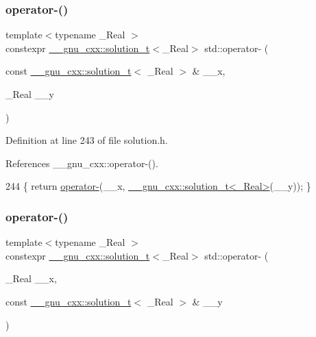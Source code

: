 \subsubsection{\texorpdfstring{operator-\/()}{operator-()}\hspace{0.1cm}{\footnotesize\ttfamily [3/6]}}
{\footnotesize\ttfamily template$<$typename \+\_\+\+Real $>$ \\
constexpr \hyperlink{namespace____gnu__cxx_ae20ea642de50eb361074c62676b0159c}{\+\_\+\+\_\+gnu\+\_\+cxx\+::solution\+\_\+t}$<$\+\_\+\+Real$>$ std\+::operator-\/ (\begin{DoxyParamCaption}\item[{const \hyperlink{namespace____gnu__cxx_ae20ea642de50eb361074c62676b0159c}{\+\_\+\+\_\+gnu\+\_\+cxx\+::solution\+\_\+t}$<$ \+\_\+\+Real $>$ \&}]{\+\_\+\+\_\+x,  }\item[{\+\_\+\+Real}]{\+\_\+\+\_\+y }\end{DoxyParamCaption})}



Definition at line 243 of file solution.\+h.



References \+\_\+\+\_\+gnu\+\_\+cxx\+::operator-\/().


\begin{DoxyCode}
244     \{ \textcolor{keywordflow}{return} \hyperlink{namespacestd_a4f4e9391eaa235d953faa99bff006e3d}{operator-}(\_\_x, \hyperlink{namespace____gnu__cxx_ae20ea642de50eb361074c62676b0159c}{\_\_gnu\_cxx::solution\_t<\_Real>}(\_\_y)); \}
\end{DoxyCode}
\mbox{\label{namespacestd_ae02c419877b95950c8c9630c6a4971a1}} 
\subsubsection{\texorpdfstring{operator-\/()}{operator-()}\hspace{0.1cm}{\footnotesize\ttfamily [4/6]}}
{\footnotesize\ttfamily template$<$typename \+\_\+\+Real $>$ \\
constexpr \hyperlink{namespace____gnu__cxx_ae20ea642de50eb361074c62676b0159c}{\+\_\+\+\_\+gnu\+\_\+cxx\+::solution\+\_\+t}$<$\+\_\+\+Real$>$ std\+::operator-\/ (\begin{DoxyParamCaption}\item[{\+\_\+\+Real}]{\+\_\+\+\_\+x,  }\item[{const \hyperlink{namespace____gnu__cxx_ae20ea642de50eb361074c62676b0159c}{\+\_\+\+\_\+gnu\+\_\+cxx\+::solution\+\_\+t}$<$ \+\_\+\+Real $>$ \&}]{\+\_\+\+\_\+y }\end{DoxyParamCaption})}



